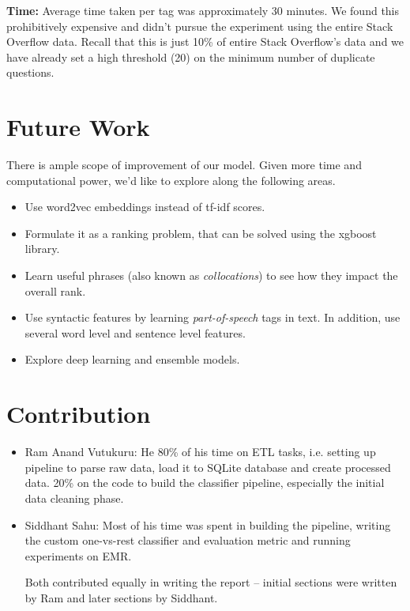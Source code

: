 \documentclass{article}
\begin{document}
\textbf{Time:} Average time taken per tag was approximately 30 minutes. We found this prohibitively expensive and didn't pursue the experiment using the entire Stack Overflow data. Recall that this is just 10\% of entire Stack Overflow's data and we have already set a high threshold (20) on the minimum number of duplicate questions.

\section{Future Work}
There is ample scope of improvement of our model. Given more time and computational power, we'd like to explore along the following areas.

\begin{itemize}
	\item Use word2vec embeddings instead of tf-idf scores.
	\item Formulate it as a ranking problem, that can be solved using the xgboost library.
	\item Learn useful phrases (also known as \textit{collocations}) to see how they impact the overall rank.
	\item Use syntactic features by learning \textit{part-of-speech} tags in text. In addition, use several word level and sentence level features.
	\item Explore deep learning and ensemble models.
\end{itemize}


\section{Contribution}
\begin{itemize}
	\item Ram Anand Vutukuru: He 80\% of his time on ETL tasks, i.e. setting up pipeline to parse raw data, load it to SQLite database and create processed data. 20\% on the code to build the classifier pipeline, especially the initial data cleaning phase.
	\item Siddhant Sahu: Most of his time was spent in building the pipeline, writing the custom one-vs-rest classifier and evaluation metric and running experiments on EMR.
	
	Both contributed equally in writing the report -- initial sections were written by Ram and later sections by Siddhant.
\end{itemize}
\end{document}
